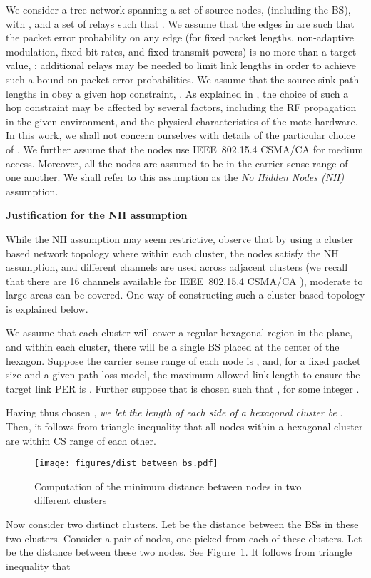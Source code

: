 \documentclass[12pt, draftclsnofoot, onecolumn]{IEEEtran}
\newcommand{\gap}{\vspace{2mm}}
\begin{document}
We consider a tree network  spanning a set of source nodes,  (including the BS), with , and a set of relays  such that . We assume that the edges in  are such that the packet error probability on any edge (for fixed packet lengths, non-adaptive modulation, fixed bit rates, and fixed transmit powers) is no more than a target value, ; additional relays may be needed to limit link lengths in order to achieve such a bound on packet error probabilities. We assume that the source-sink path lengths in  obey a given hop constraint, . As explained in \cite{bhattacharya-kumar14tr-qos-aware-nw-design-csma}, the choice of such a hop constraint may be affected by several factors, including the RF propagation in the given environment, and the physical characteristics of the mote hardware. In this work, we shall not concern ourselves with details of the particular choice of . We further assume that the nodes use IEEE~802.15.4 CSMA/CA for medium access. Moreover, all the nodes are assumed to be in the carrier sense range of one another. We shall refer to this assumption as the \emph{No Hidden Nodes (NH)} assumption. 

\gap
\noindent
\textbf{Justification for the NH assumption}

While the NH assumption may seem restrictive, observe that by using a cluster based network topology where within each cluster, the nodes satisfy the NH assumption, and different channels are used across adjacent clusters (we recall that there are 16 channels available for IEEE~802.15.4 CSMA/CA \cite{IEEE}), moderate to large areas can be covered. One way of constructing such a cluster based topology is explained below. 

We assume that each cluster will cover a regular hexagonal region in the plane, and within each cluster, there will be a single BS placed at the center of the hexagon. Suppose the carrier sense range of each node is , and, for a fixed packet size and a given path loss model, the maximum allowed link length to ensure the target link PER  is . Further suppose that  is chosen such that , for some integer . 

Having thus chosen , \emph{we let the length of each side of a hexagonal cluster be }. Then, it follows from triangle inequality that all nodes within a hexagonal cluster are within CS range of each other.

\begin{figure}[h]
\begin{center}
\texttt{[image: figures/dist\_between\_bs.pdf]}
\caption{Computation of the minimum distance between nodes in two different clusters}
\label{fig:dist_between_bs}
\vspace{-5mm}
\end{center}
\end{figure}
Now consider two distinct clusters. Let  be the distance between the BSs in these two clusters. Consider a pair of nodes, one picked from each of these clusters. Let  be the distance between these two nodes. See Figure~\ref{fig:dist_between_bs}. It follows from triangle inequality that
\end{document}
